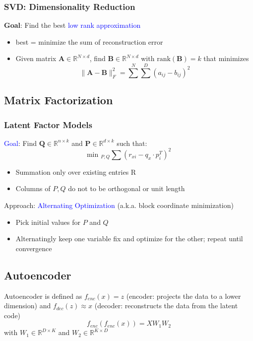 \documentclass[a4paper,10pt,twoside=true,DIV=10,headsepline,plainheadsepline]{scrartcl}
\begin{document}
		\subsubsection{SVD: Dimensionality Reduction}
		\textbf{Goal}: Find the best \textcolor{blue}{low rank approximation}
		\begin{itemize}
			\item best = minimize the sum of reconstruction error
			\item Given matrix $\mathbf{A} \in \mathbb{R}^{N \times d}$, find $\mathbf{B} \in \mathbb{R}^{N \times d}$ with $\textrm{rank}(\mathbf{B}) = k$ that minimizes
			\begin{equation}
				\|\mathbf{A} - \mathbf{B}\|_F^2 = \sum^N \sum^D (a_{ij} - b_{ij})^2
			\end{equation}
		\end{itemize}

		\subsection{Matrix Factorization}

		\subsubsection{Latent Factor Models}
		\textcolor{blue}{Goal}: Find $\mathbf{Q} \in \mathbb{R}^{n \times k}$ and $\mathbf{P} \in \mathbb{R}^{d \times k}$ such that:
		\begin{equation}
			\textrm{min }_{P,Q} \sum (r_{xi} - q_x \cdot p_i^T)^2
		\end{equation}

		\begin{itemize}[noitemsep]
			\item Summation only over existing entries R
			\item Columns of $P, Q$ do not to be orthogonal or unit length
		\end{itemize}


		Approach: \textcolor{blue}{Alternating Optimization} (a.k.a. block coordinate minimization)
		\begin{itemize}[noitemsep]
			\item Pick initial values for $P$ and $Q$
			\item Alternatingly keep one variable fix and optimize for the other; repeat until convergence
		\end{itemize}
	

		\subsection{Autoencoder}
			Autoencoder is defined as $f_{enc}(x) = z$ (encoder: projects the data to a lower dimension) and $f_{dec}(z) \approx x$ (decoder: reconstructs the data from the latent code)
			\begin{equation} 
				f_{enc}(f_{enc}(x)) = X W_1 W_2
			\end{equation}
			with $W_1 \in \mathbb{R}^{D \times K} $ and $W_2 \in \mathbb{R}^{K \times D} $
\end{document}

